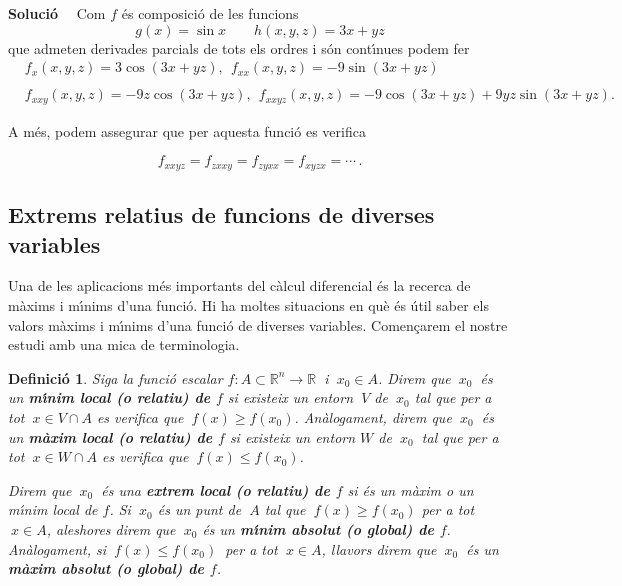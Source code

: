 \documentclass[12pt]{article}
\newcommand{\solucio}{\textbf{Soluci{\'o}}\ \ }
\newtheorem{definicio}{Definici{\'o}}[subsection]
\newcommand{\R}{\mathbb{R}}
\begin{document}
\solucio
Com $f$ {\'e}s composici{\'o} de les funcions
$$
g(x)=\sin  x  \qquad h(x,y,z)=3x+yz
$$
que admeten derivades parcials de tots els ordres i s{\'o}n cont{\'\i}nues podem fer
\begin{align*}
& f_{x}(x,y,z)  =3\cos(3x+yz),
\ \  f_{xx}(x,y,z)  =-9\sin(3x+yz)\\
&\\
& f_{xxy}(x,y,z)  =-9z\cos(3x+yz),\
\ f_{xxyz}(x,y,z)  =-9\cos(3x+yz)+9yz\sin(3x+yz).
\end{align*}

A m{\'e}s, podem assegurar que per aquesta funci{\'o} es verifica

\[
f_{xxyz}=f_{zxxy}=f_{zyxx}=f_{xyzx}=\cdots\, .
\]


\subsection{Extrems relatius de funcions de diverses variables}

Una de les aplicacions m{\'e}s
importants del c{\`a}lcul diferencial {\'e}s la recerca de
m{\`a}xims i m{\'\i}nims d'una funci{\'o}. Hi ha moltes
situacions en qu{\`e} {\'e}s {\'u}til saber els valors m{\`a}xims i m{\'\i}nims
d'una funci{\'o} de diverses variables. Comen\c{c}arem el nostre estudi amb una mica de
terminologia.

\vspace{0.4cm}
\begin{definicio}
Siga la funci{\'o} escalar $ f:A \subset \R ^ n \longrightarrow \R\ $ i
$\ x_0 \in A $. Direm que $\ x_0\ $ {\'e}s un \textbf{m{\'\i}nim local (o
relatiu) de $ f $} si existeix un entorn $\ V $ de $\ x_0 $ tal que per a
tot $\ x \in V \cap A $ es verifica que $\ f (x) \geq f (x_0) $.
An{\`a}logament, direm que $\ x_0\ $ {\'e}s un \textbf{m{\`a}xim local (o
relatiu) de $ f $} si existeix un entorn $ W $ de $ \ x_0\ $ tal que per a
tot $\ x \in W \cap A $ es verifica que $\ f (x) \leq f (x_0) $.

Direm que $\ x_0 \ $ {\'e}s una \textbf{extrem local (o relatiu) de $ f $} si {\'e}s
un m{\`a}xim o un m{\'\i}nim local de $ f $. Si $\ x_0 $ {\'e}s un punt de $\ A $
tal que $\ f (x) \geq f (x_0) $ per a tot $\ x \in A $, aleshores direm que
$\ x_0 $ {\'e}s un \textbf{m{\'\i}nim absolut (o global) de $ f $}.
An{\`a}logament, si $\ f (x) \leq f (x_0)\ $ per a tot $\ x \in A $, llavors
direm que $\ x_0\ $ {\'e}s un \textbf{m{\`a}xim absolut (o global) de
$ f $}.

\end{definicio}
\end{document}
